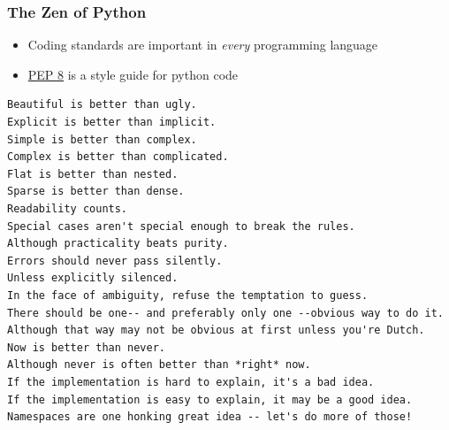 \documentclass[pdf]{beamer}
\begin{document}
\begin{frame}[fragile]
\frametitle{The Zen of Python}
\begin{itemize}
	\item Coding standards are important in \textit{every} programming language%
	\item \href{https://www.python.org/dev/peps/pep-0008/}{PEP 8} is a style guide for python code  
\end{itemize}

\scriptsize
\begin{verbatim}
Beautiful is better than ugly.
Explicit is better than implicit.
Simple is better than complex.
Complex is better than complicated.
Flat is better than nested.
Sparse is better than dense.
Readability counts.
Special cases aren't special enough to break the rules.
Although practicality beats purity.
Errors should never pass silently.
Unless explicitly silenced.
In the face of ambiguity, refuse the temptation to guess.
There should be one-- and preferably only one --obvious way to do it.
Although that way may not be obvious at first unless you're Dutch.
Now is better than never.
Although never is often better than *right* now.
If the implementation is hard to explain, it's a bad idea.
If the implementation is easy to explain, it may be a good idea.
Namespaces are one honking great idea -- let's do more of those!
\end{verbatim}
\normalsize
\end{frame}
\end{document}

